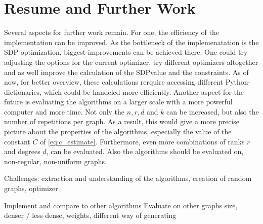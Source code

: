 \chapter{Resume and Further Work}\label{chapter:resmue_further_work}

Several aspects for further work remain. 
For one, the efficiency of the implementation can be improved. As the bottleneck of the implemenatation is the SDP optimization, biggest improvements can be achieved there. One could try adjusting the options for the current optimizer, try different optimizers altogether and as well improve the calculation of the SDPvalue and the constraints. As of now, for better overview, these calculations rerquire accessing different Python-dictionaries, which could be handeled more efficiently.
Another aspect for the future is evaluating the algorithms on a larger scale with a more powerful computer and more time. Not only the $n, r, d$ and $k$ can be increased, but also the number of repetitions per graph. As a result, this would give a more precise picture about the properties of the algorithms, especially the value of the constant $C$ of \cref{eq:c_estimate}. Furthermore, even more combinations of ranks $r$ and degrees $d$, can be evaluated. Also the algorithms should be evaluated on, non-regular, non-uniform graphs. 

Challenges: extraction and understanding of the algorithms, creation of random graphs, optimizer



Implement and compare to other algorithms
Evaluate on other graphs size, denser / less dense, weights, different way of generating

